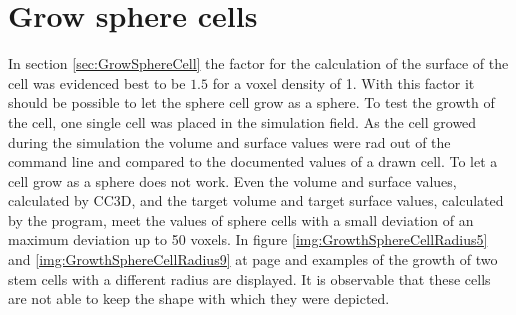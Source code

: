 \section{Grow sphere cells}
In section \ref{sec:GrowSphereCell} the factor for the calculation of the surface of the cell was evidenced best to be $1.5$ for a voxel density of 1. With this factor it should be possible to let the sphere cell grow as a sphere. To test the growth of the cell, one single cell was placed in the simulation field. As the cell growed during the simulation the volume and surface values were rad out of the command line and compared to the documented values of a drawn cell. \newline
To let a cell grow as a sphere does not work. Even the volume and surface values, calculated by \ac{CC3D}, and the target volume and target surface values, calculated by the program, meet the values of sphere cells with a small deviation of an maximum deviation up to 50 voxels. \newline
In figure \ref{img:GrowthSphereCellRadius5} and \ref{img:GrowthSphereCellRadius9} at page \pageref{img:GrowthSphereCellRadius5} and \pageref{img:GrowthSphereCellRadius9} examples of the growth of two stem cells with a different radius are displayed. It is observable that these cells are not able to keep the shape with which they were depicted.


